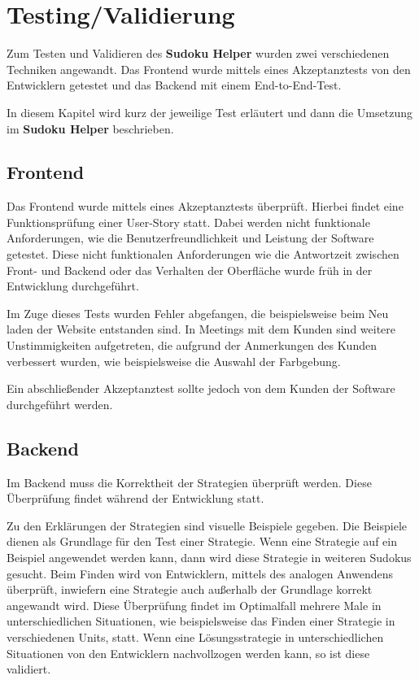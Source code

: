 
\chapter{Testing/Validierung}
Zum Testen und Validieren des \textbf{Sudoku Helper} wurden zwei verschiedenen Techniken angewandt. Das Frontend wurde mittels eines Akzeptanztests von den Entwicklern getestet und das Backend mit einem End-to-End-Test.

In diesem Kapitel wird kurz der jeweilige Test erläutert und dann die Umsetzung im \textbf{Sudoku Helper} beschrieben.

\section{Frontend}

Das Frontend wurde mittels eines Akzeptanztests überprüft. Hierbei findet eine Funktionsprüfung einer User-Story statt. Dabei werden nicht funktionale Anforderungen, wie die Benutzerfreundlichkeit und Leistung der Software getestet. Diese nicht funktionalen Anforderungen wie die Antwortzeit zwischen Front- und Backend oder das Verhalten der Oberfläche wurde früh in der Entwicklung durchgeführt.

Im Zuge dieses Tests wurden Fehler abgefangen, die beispielsweise beim Neu laden der Website entstanden sind. In Meetings mit dem Kunden sind weitere Unstimmigkeiten aufgetreten, die aufgrund der Anmerkungen des Kunden verbessert wurden, wie beispielsweise die Auswahl der Farbgebung.

Ein abschließender Akzeptanztest sollte jedoch von dem Kunden der Software durchgeführt werden.

\section{Backend}

Im Backend muss die Korrektheit der Strategien überprüft werden. Diese Überprüfung findet während der Entwicklung statt. 

Zu den Erklärungen der Strategien sind visuelle Beispiele gegeben. Die Beispiele dienen als Grundlage für den Test einer Strategie. Wenn eine Strategie auf ein Beispiel angewendet werden kann, dann wird diese Strategie in weiteren Sudokus gesucht. Beim Finden wird von Entwicklern, mittels des analogen Anwendens überprüft, inwiefern eine Strategie auch außerhalb der Grundlage korrekt angewandt wird. Diese Überprüfung findet im Optimalfall mehrere Male in unterschiedlichen Situationen, wie beispielsweise das Finden einer Strategie in verschiedenen Units, statt. Wenn eine Lösungsstrategie in unterschiedlichen Situationen von den Entwicklern nachvollzogen werden kann, so ist diese validiert.

